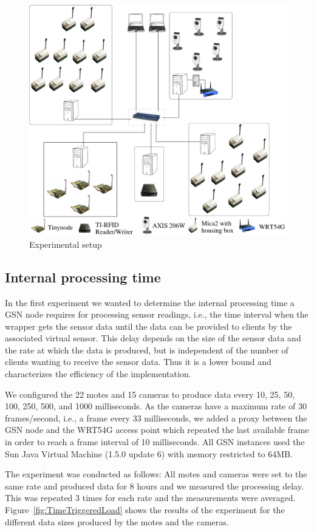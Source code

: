 \begin{figure}%
  \centering
  \includegraphics[width=0.8\columnwidth]{ch-gsn-figures/setup}
  \caption{Experimental setup}
  \label{fig:ExperimentalSetup}
\end{figure}


\subsection{Internal processing time}
\label{sec:exepr-eval}

In the first experiment we wanted to determine the internal processing time a
GSN node requires for processing sensor readings, i.e., the time interval when
the wrapper gets the sensor data until the data can be provided to clients by
the associated virtual sensor. This delay depends on the size of the sensor
data and the rate at which the data is produced, but is independent of the
number of clients wanting to receive the sensor data. Thus it is a lower bound
and characterizes the efficiency of the implementation. 

We configured the 22 motes and 15 cameras to produce data every 10, 25, 50,
100, 250, 500, and 1000 milliseconds. As the cameras have a maximum rate of 30
frames/second, i.e., a frame every 33 milliseconds, we added a proxy between
the GSN node and the WRT54G access point which repeated the last available
frame in order to reach a frame interval of 10 milliseconds. All GSN instances
used the Sun Java Virtual Machine (1.5.0 update 6) with memory restricted to
64MB.

The experiment was conducted as follows: All motes and cameras were set to the
same rate and produced data for 8 hours and we measured the processing delay.
This was repeated 3 times for each rate and the measurements were averaged.
Figure~\ref{fig:TimeTriggeredLoad} shows the results of the experiment for the
different data sizes produced by the motes and the cameras.

